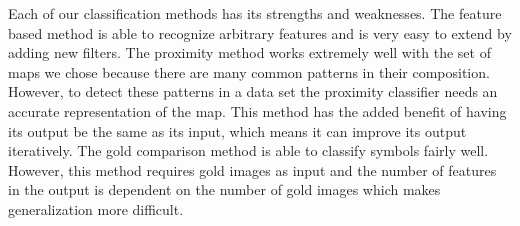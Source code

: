 Each of our classification methods has its strengths and
weaknesses.  The feature based method is able to recognize arbitrary
features and is very easy to extend by adding new filters.
The proximity method works extremely well with the set of maps
we chose because there are many common patterns in their composition.
However, to detect these patterns in a
data set the proximity classifier needs an accurate representation of
the map. This method has the added benefit of having its output be the same as
its input, which means it can improve its output iteratively.  The gold comparison method is able to classify symbols
fairly well. However, this method
requires gold images as input and the number of features in the output
is dependent on the number of gold images which makes generalization more difficult.
